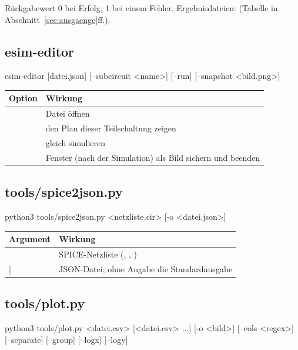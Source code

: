 Rückgabewert 0 bei Erfolg, 1 bei einem Fehler. Ergebnisdateien:
 (Tabelle in
Abschnitt~\ref{sec:ausgaenge}ff.).

\subsection{esim-editor}

\begin{shell}
esim-editor [datei.json] [--subcircuit <name>] [--run] [--snapshot <bild.png>]
\end{shell}

\begin{longtable}{@{}P{4.2cm}P{9.6cm}@{}}
  \toprule
  Option & Wirkung \\
  \midrule
  \endhead
  \bottomrule
  \endfoot
   & Datei öffnen \\
   & den Plan dieser Teilschaltung zeigen \\
   & gleich simulieren \\
   & Fenster (nach der Simulation) als Bild sichern und beenden \\
\end{longtable}

\subsection{tools/spice2json.py}

\begin{shell}
python3 tools/spice2json.py <netzliste.cir> [-o <datei.json>]
\end{shell}

\begin{longtable}{@{}P{4.2cm}P{9.6cm}@{}}
  \toprule
  Argument & Wirkung \\
  \midrule
  \endhead
  \bottomrule
  \endfoot
   & SPICE-Netzliste (, , ) \\
   |  & JSON-Datei; ohne Angabe die Standardausgabe \\
\end{longtable}

\subsection{tools/plot.py}

\begin{shell}
python3 tools/plot.py <datei.csv> [<datei.csv> ...] [-o <bild>] [--cols <regex>]
                      [--separate] [--group] [--logx] [--logy]
\end{shell}

